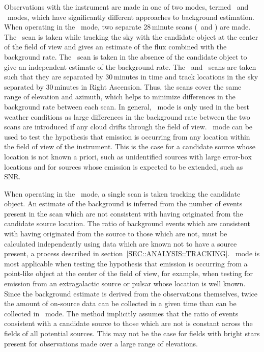 Observations with the instrument are made in one of two modes, termed
\Pairs\ and \Trk\ modes, which have significantly different approaches
to background estimation. When operating in the \Pairs\ mode, two
separate 28\,minute scans (\On\ and \Off) are made. The \On\ scan is
taken while tracking the sky with the candidate object at the center
of the field of view and gives an estimate of the \Gray flux combined
with the background rate. The \Off\ scan is taken in the absence of
the candidate object to give an independent estimate of the background
rate. The \On\ and \Off\ scans are taken such that they are separated
by 30\,minutes in time and track locations in the sky separated by
30\,minutes in Right Ascension. Thus, the scans cover the same range
of elevation and azimuth, which helps to minimize differences in the
background rate between each scan. In general, \Pairs\ mode is only
used in the best weather conditions as large differences in the
background rate between the two scans are introduced if any cloud
drifts through the field of view. \Pairs\ mode can be used to test the
hypothesis that \Gray emission is occurring from any location within
the field of view of the instrument. This is the case for a candidate
source whose location is not known a priori, such as unidentified
sources with large error-box locations and for sources whose emission
is expected to be extended, such as SNR.

When operating in the \Trk\ mode, a single scan is taken tracking the
candidate object. An estimate of the background is inferred from the
number of events present in the scan which are not consistent with
having originated from the candidate source location. The ratio of
background events which are consistent with having originated from the
source to those which are not, must be calculated independently using
data which are known not to have a source present, a process described
in section~\ref{SEC::ANALYSIS::TRACKING}. \Trk\ mode is most
applicable when testing the hypothesis that \Gray emission is
occurring from a point-like object at the center of the field of view,
for example, when testing for emission from an extragalactic source or
pulsar whose location is well known. Since the background estimate is
derived from the observations themselves, twice the amount of
on-source data can be collected in a given time than can be collected
in \Pairs\ mode. The method implicitly assumes that the ratio of
events consistent with a candidate source to those which are not is
constant across the fields of all potential sources. This may not be
the case for fields with bright stars present for observations made
over a large range of elevations.

